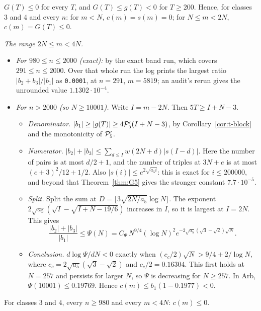 \begin{corollary}\label{cor:t-block}
$G(T)\le0$ for every $T$, and $G(T)\le g(T)<0$ for $T\ge200$. Hence, for classes $3$ and $4$ and every $n$: for $m<N$,
$c(m)=s(m)=0$; for $N\le m<2N$, $c(m)=G(T)\le0$.
\end{corollary}

\emph{The range $2N\le m<4N$.}
\begin{itemize}
\item \emph{For $980\le n\le2000$ (exact):} by the exact band run, which covers $291\le n\le2000$. Over that whole run the
log prints the largest ratio $|b_2+b_3|/|b_1|$ as \texttt{0.0001}, at $n=291$, $m=5819$; an audit's rerun gives the
unrounded value $1.1302\cdot10^{-4}$.
\item \emph{For $n>2000$ (so $N\ge10001$).} Write $I=m-2N$. Then $5T\ge I+N-3$.
\begin{itemize}
\item \emph{Denominator.} $|b_1|\ge|g(T)|\ge4\mathcal P_5'(I+N-3)$, by Corollary~\ref{cor:t-block} and the monotonicity of
$\mathcal P_5'$.
\item \emph{Numerator.} $|b_2|+|b_3|\le\sum_{d\le I}w(2N+d)|s(I-d)|$. Here the number of pairs is at most $d/2+1$, and the
number of triples at $3N+e$ is at most $(e+3)^2/12+1/2$. Also $|s(i)|\le e^{2\sqrt{a_5i}}$: this is exact for $i\le200000$,
and beyond that Theorem~\ref{thm:G5} gives the stronger constant $7.7\cdot10^{-5}$.
\item \emph{Split.} Split the sum at $D=\lfloor3\sqrt{2N/a_5}\log N\rfloor$. The exponent
$2\sqrt{a_5}(\sqrt I-\sqrt{I+N-19/6})$ increases in $I$, so it is largest at $I=2N$. This gives
\[
\frac{|b_2|+|b_3|}{|b_1|}\le\Psi(N)=C_\Psi\,N^{9/4}(\log N)^2e^{-2\sqrt{a_5}(\sqrt3-\sqrt2)\sqrt N}.
\]
\item \emph{Conclusion.} $d\log\Psi/dN<0$ exactly when $(c_c/2)\sqrt N>9/4+2/\log N$, where
$c_c=2\sqrt{a_5}(\sqrt3-\sqrt2)$ and $c_c/2=0.16304$. This first holds at $N=257$ and persists for larger $N$, so $\Psi$ is
decreasing for $N\ge257$. In Arb, $\Psi(10001)\le0.19769$. Hence $c(m)\le b_1(1-0.1977)<0$.
\end{itemize}
\end{itemize}

\begin{corollary}\label{cor:t-band34}
For classes $3$ and $4$, every $n\ge980$ and every $m<4N$: $c(m)\le0$.
\end{corollary}

